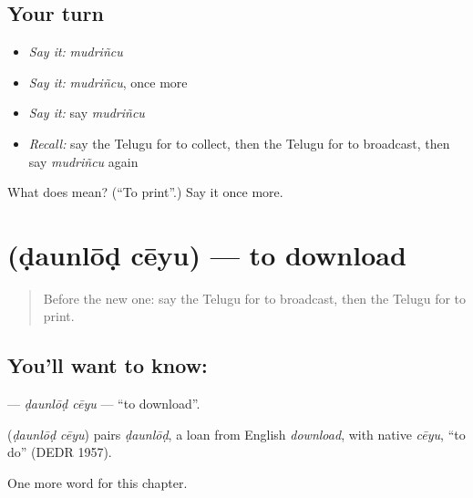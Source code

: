 \subsection*{Your turn}
\begin{itemize}
\raggedright
  \item \emph{Say it:} \emph{mudriñcu}
  \item \emph{Say it:} \emph{mudriñcu}, once more
  \item \emph{Say it:} say \emph{mudriñcu}
  \item \emph{Recall:} say the Telugu for to collect, then the Telugu for to broadcast, then say \emph{mudriñcu} again
\end{itemize}

\begin{tcolorbox}[breakable,colback=teal!4,colframe=teal!35!black,title={Before you move on}]
What does  mean? (\textquotedblleft{}To print\textquotedblright{}.) Say it once more.
\end{tcolorbox}
\section[\texorpdfstring{\te{డౌన్లోడ్} \te{చేయు} (ḍaunlōḍ cēyu)}{డౌన్లోడ్ చేయు (ḍaunlōḍ cēyu)}]{  (ḍaunlōḍ cēyu) — to download}

\label{lesson:TE-C245-daunlod-ceyu}



\begin{quote}
Before the new one: say the Telugu for to broadcast, then the Telugu for to print.
\end{quote}

\subsection*{You'll want to know:  }
\textbf{ } — \emph{ḍaunlōḍ cēyu} — \textquotedblleft{}to download\textquotedblright{}.

\begin{cousinweb}
\textbf{ } (\emph{ḍaunlōḍ cēyu}) pairs \emph{ḍaunlōḍ}, a loan from English \emph{download}, with native \emph{cēyu}, \textquotedblleft{}to do\textquotedblright{} (DEDR 1957).
\end{cousinweb}

\begin{grammarlens}[title={What you've built}]
One more word for this chapter.
\end{grammarlens}

